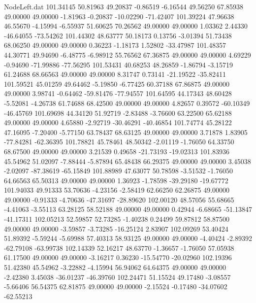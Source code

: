 \begin{filecontents}{NodeLeft.dat}
 101.34145   50.81963   49.20837    -0.86519   -6.16544   49.56250   67.85938   49.00000   49.00000   -1.81963   -0.20837  -10.02290  -71.42407
 101.39224   47.96638   46.55670    -4.15994   -6.55937   51.60625   70.26562   49.00000   49.00000    1.03362    2.44330  -46.64055  -73.54262
 101.44302   48.63777   50.18173     0.13756   -3.01394   51.73438   68.06250   49.00000   49.00000    0.36223   -1.18173    1.52802  -33.47987
 101.48357   44.30771   49.94690    -6.48775   -6.98912   55.76562   67.36875   49.00000   49.00000    4.69229   -0.94690  -71.99886  -77.56295
 101.53431   40.68253   48.26859    -1.86794   -3.15719   61.24688   68.66563   49.00000   49.00000    8.31747    0.73141  -21.19522  -35.82411
 101.59521   45.01259   49.64462    -5.19850   -6.77425   60.37188   67.86875   49.00000   49.00000    3.98741   -0.64462  -59.81476  -77.94557
 101.64595   44.17343   48.60428    -5.52081   -4.26738   61.74688   68.42500   49.00000   49.00000    4.82657    0.39572  -60.10349  -46.45769
 101.69698   44.34120   51.92719    -2.83488   -3.76600   63.22500   65.62188   49.00000   49.00000    4.65880   -2.92719  -30.46291  -40.46854
 101.74774   45.28122   47.16095    -7.20400   -5.77150   63.78437   68.63125   49.00000   49.00000    3.71878    1.83905  -77.84281  -62.36395
 101.78821   45.78461   48.50342    -2.01119   -1.76050   64.33750   68.67500   49.00000   49.00000    3.21539    0.49658  -21.73193  -19.02313
 101.83936   45.54962   51.02097    -7.88444   -5.87894   65.48438   66.29375   49.00000   49.00000    3.45038   -2.02097  -87.38619  -65.15849
 101.88989   47.63077   50.78598    -3.51532   -1.76050   64.66563   65.50313   49.00000   49.00000    1.36923   -1.78598  -39.29180  -19.67772
 101.94033   49.91333   53.70636    -4.23156   -2.58419   62.66250   62.26875   49.00000   49.00000   -0.91333   -4.70636  -47.31697  -28.89620
 102.00120   48.57056   55.68665    -4.41063   -3.55113   63.28125   58.52188   49.00000   49.00000    0.42944   -6.68665  -51.13847  -41.17311
 102.05213   52.59857   52.73285    -1.40238    0.24499   59.87812   58.87500   49.00000   49.00000   -3.59857   -3.73285  -16.25124    2.83907
 102.09269   53.40424   51.89392    -5.59244   -5.69988   57.40313   58.93125   49.00000   49.00000   -4.40424   -2.89392  -62.79108  -63.99738
 102.14339   52.16217   48.63770    -1.36657   -1.76050   57.05938   61.17500   49.00000   49.00000   -3.16217    0.36230  -15.54770  -20.02960
 102.19396   51.42380   45.54962    -3.22882   -4.15994   56.94062   64.64375   49.00000   49.00000   -2.42380    3.45038  -36.01237  -46.39760
 102.24471   51.15524   49.17480    -3.08557   -5.66406   56.54375   62.81875   49.00000   49.00000   -2.15524   -0.17480  -34.07602  -62.55213

\end{filecontents}
